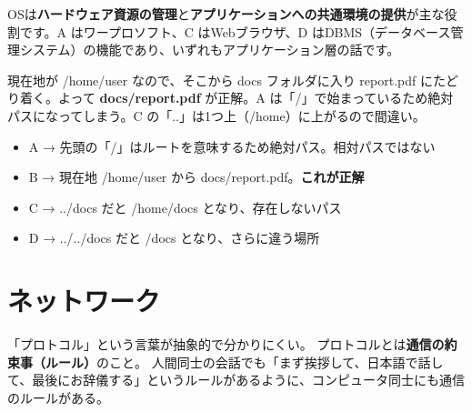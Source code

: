 \kaitoupage


\begin{kaisetsu}
OSは\textbf{ハードウェア資源の管理}と\textbf{アプリケーションへの共通環境の提供}が主な役割です。A はワープロソフト、C はWebブラウザ、D はDBMS（データベース管理システム）の機能であり、いずれもアプリケーション層の話です。
\end{kaisetsu}


\begin{kaisetsu}
現在地が /home/user なので、そこから docs フォルダに入り report.pdf にたどり着く。よって \textbf{docs/report.pdf} が正解。A は「/」で始まっているため絶対パスになってしまう。C の「..」は1つ上（/home）に上がるので間違い。
\end{kaisetsu}

\begin{goutoubun}
\begin{itemize}
  \item A → 先頭の「/」はルートを意味するため絶対パス。相対パスではない
  \item B → 現在地 /home/user から docs/report.pdf。\textbf{これが正解}
  \item C → ../docs だと /home/docs となり、存在しないパス
  \item D → ../../docs だと /docs となり、さらに違う場所
\end{itemize}
\end{goutoubun}




\section{ネットワーク}

\mondaipage
{}

\begin{stumble}
「プロトコル」という言葉が抽象的で分かりにくい。
プロトコルとは\textbf{通信の約束事（ルール）}のこと。
人間同士の会話でも「まず挨拶して、日本語で話して、最後にお辞儀する」というルールがあるように、コンピュータ同士にも通信のルールがある。
\end{stumble}

